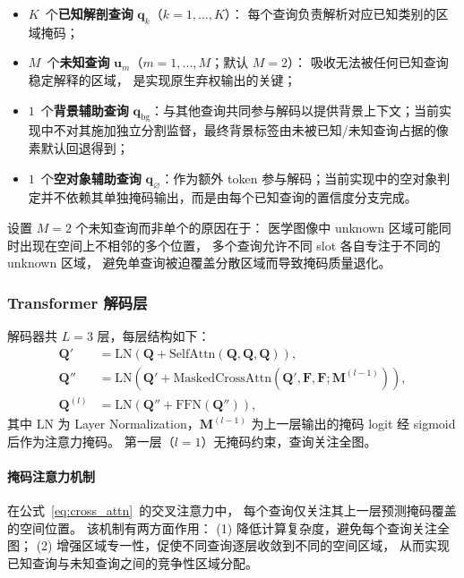 \documentclass[3p,twocolumn,authoryear]{elsarticle}
\newcommand{\bF}{\mathbf{F}}                              %
\newcommand{\bq}{\mathbf{q}}                              %
\newcommand{\bu}{\mathbf{u}}                              %
\begin{document}
\begin{itemize}[nosep]
  \item $K$~个\textbf{已知解剖查询} $\bq_k$（$k = 1, \ldots, K$）：
        每个查询负责解析对应已知类别的区域掩码；
  \item $M$~个\textbf{未知查询} $\bu_m$（$m = 1, \ldots, M$；默认 $M=2$）：
        吸收无法被任何已知查询稳定解释的区域，
        是实现原生弃权输出的关键；
  \item $1$~个\textbf{背景辅助查询} $\bq_{\text{bg}}$：与其他查询共同参与解码以提供背景上下文；当前实现中不对其施加独立分割监督，最终背景标签由未被已知/未知查询占据的像素默认回退得到；
  \item $1$~个\textbf{空对象辅助查询} $\bq_{\varnothing}$：作为额外 token 参与解码；当前实现中的空对象判定并不依赖其单独掩码输出，而是由每个已知查询的置信度分支完成。
\end{itemize}

设置 $M=2$ 个未知查询而非单个的原因在于：
医学图像中 unknown 区域可能同时出现在空间上不相邻的多个位置，
多个查询允许不同 slot 各自专注于不同的 unknown 区域，
避免单查询被迫覆盖分散区域而导致掩码质量退化。

\subsubsection{Transformer 解码层}\label{sec:method:parser:decoder}

解码器共 $L=3$ 层，每层结构如下：
\begin{align}
  \mathbf{Q}' &= \text{LN}\!\left(\mathbf{Q} + \text{SelfAttn}(\mathbf{Q}, \mathbf{Q}, \mathbf{Q})\right), \label{eq:self_attn} \\
  \mathbf{Q}'' &= \text{LN}\!\left(\mathbf{Q}' + \text{MaskedCrossAttn}(\mathbf{Q}', \bF, \bF; \mathbf{M}^{(l-1)})\right), \label{eq:cross_attn} \\
  \mathbf{Q}^{(l)} &= \text{LN}\!\left(\mathbf{Q}'' + \text{FFN}(\mathbf{Q}'')\right), \label{eq:ffn}
\end{align}
其中 $\text{LN}$ 为 Layer Normalization，$\mathbf{M}^{(l-1)}$ 为上一层输出的掩码 logit 经 sigmoid 后作为注意力掩码。
第一层（$l=1$）无掩码约束，查询关注全图。

\paragraph{掩码注意力机制}
在公式~\eqref{eq:cross_attn}~的交叉注意力中，
每个查询仅关注其上一层预测掩码覆盖的空间位置。
该机制有两方面作用：
(1) 降低计算复杂度，避免每个查询关注全图；
(2) 增强区域专一性，促使不同查询逐层收敛到不同的空间区域，
从而实现已知查询与未知查询之间的竞争性区域分配。
\end{document}
